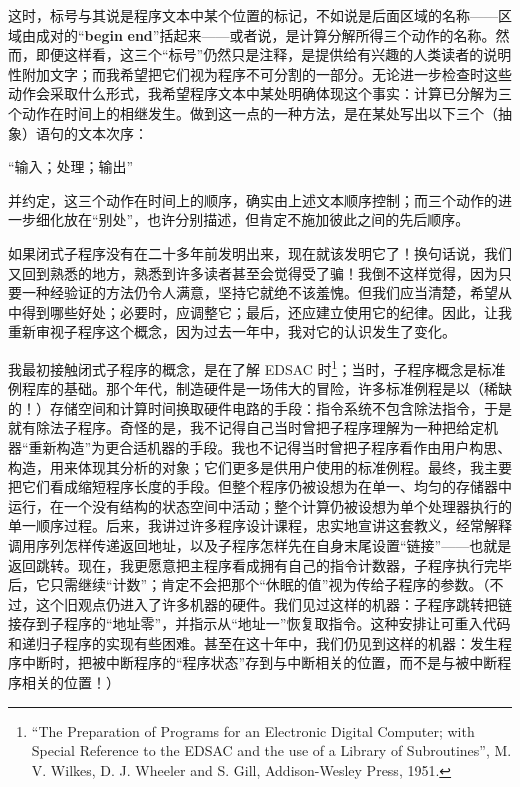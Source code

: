 \documentclass[twoside,11pt,fontset=none]{ctexbook}
\begin{document}
\noindent
这时，标号与其说是程序文本中某个位置的标记，不如说是后面区域的名称——区域由成对的“\textbf{begin} \textendash  \textbf{end}”括起来——或者说，是计算分解所得三个动作的名称。然而，即便这样看，这三个“标号”仍然只是注释，是提供给有兴趣的人类读者的说明性附加文字；而我希望把它们视为程序不可分割的一部分。无论进一步检查时这些动作会采取什么形式，我希望程序文本中某处明确体现这个事实：计算已分解为三个动作在时间上的相继发生。做到这一点的一种方法，是在某处写出以下三个（抽象）语句的文本次序：
\medskip

{
	\setlength{\parindent}{8em}
	\hspace{-.4em}``输入；处理；输出''
}
\medskip

\noindent
并约定，这三个动作在时间上的顺序，确实由上述文本顺序控制；而三个动作的进一步细化放在“别处”，也许分别描述，但肯定不施加彼此之间的先后顺序。

如果闭式子程序没有在二十多年前发明出来，现在就该发明它了！换句话说，我们又回到熟悉的地方，熟悉到许多读者甚至会觉得受了骗！我倒不这样觉得，因为只要一种经验证的方法仍令人满意，坚持它就绝不该羞愧。但我们应当清楚，希望从中得到哪些好处；必要时，应调整它；最后，还应建立使用它的纪律。因此，让我重新审视子程序这个概念，因为过去一年中，我对它的认识发生了变化。

我最初接触闭式子程序的概念，是在了解 EDSAC 时\footnote{``The Preparation of Programs for an Electronic Digital Computer; with Special Reference to the EDSAC and the use of a Library of Subroutines'', M. V. Wilkes, D. J. Wheeler and S. Gill, Addison-Wesley Press, 1951.}；当时，子程序概念是标准例程库的基础。那个年代，制造硬件是一场伟大的冒险，许多标准例程是以（稀缺的！）存储空间和计算时间换取硬件电路的手段：指令系统不包含除法指令，于是就有除法子程序。奇怪的是，我不记得自己当时曾把子程序理解为一种把给定机器“重新构造”为更合适机器的手段。我也不记得当时曾把子程序看作由用户构思、构造，用来体现其分析的对象；它们更多是供用户使用的标准例程。最终，我主要把它们看成缩短程序长度的手段。但整个程序仍被设想为在单一、均匀的存储器中运行，在一个没有结构的状态空间中活动；整个计算仍被设想为单个处理器执行的单一顺序过程。后来，我讲过许多程序设计课程，忠实地宣讲这套教义，经常解释调用序列怎样传递返回地址，以及子程序怎样先在自身末尾设置“链接”——也就是返回跳转。现在，我更愿意把主程序看成拥有自己的指令计数器，子程序执行完毕后，它只需继续“计数”；肯定不会把那个“休眠的值”视为传给子程序的参数。（不过，这个旧观点仍进入了许多机器的硬件。我们见过这样的机器：子程序跳转把链接存到子程序的“地址零”，并指示从“地址一”恢复取指令。这种安排让可重入代码和递归子程序的实现有些困难。甚至在这十年中，我们仍见到这样的机器：发生程序中断时，把被中断程序的“程序状态”存到与中断相关的位置，而不是与被中断程序相关的位置！）
\end{document}
